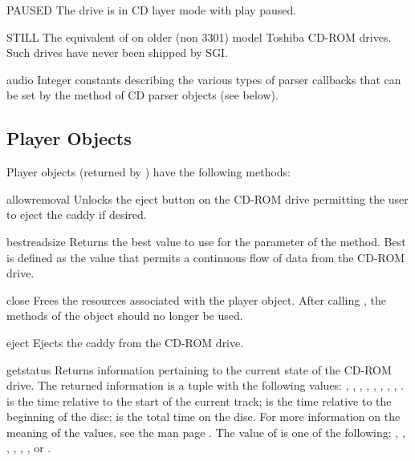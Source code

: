 \begin{datadesc}{PAUSED}
The drive is in CD layer mode with play paused.
\end{datadesc}

\begin{datadesc}{STILL}
The equivalent of  on older (non 3301) model Toshiba
CD-ROM drives.  Such drives have never been shipped by SGI.
\end{datadesc}

\begin{datadesc}{audio}
Integer constants describing the various types of parser callbacks
that can be set by the  method of CD parser
objects (see below).
\end{datadesc}


\subsection{Player Objects}
\label{player-objects}

Player objects (returned by ) have the following
methods:

\begin{methoddesc}[CD player]{allowremoval}{}
Unlocks the eject button on the CD-ROM drive permitting the user to
eject the caddy if desired.
\end{methoddesc}

\begin{methoddesc}[CD player]{bestreadsize}{}
Returns the best value to use for the  parameter of
the  method.  Best is defined as the value that
permits a continuous flow of data from the CD-ROM drive.
\end{methoddesc}

\begin{methoddesc}[CD player]{close}{}
Frees the resources associated with the player object.  After calling
, the methods of the object should no longer be used.
\end{methoddesc}

\begin{methoddesc}[CD player]{eject}{}
Ejects the caddy from the CD-ROM drive.
\end{methoddesc}

\begin{methoddesc}[CD player]{getstatus}{}
Returns information pertaining to the current state of the CD-ROM
drive.  The returned information is a tuple with the following values:
, , , , ,
, , , .
 is the time relative to the start of the current track;
 is the time relative to the beginning of the disc;
 is the total time on the disc.  For more information on
the meaning of the values, see the man page .
The value of  is one of the following: ,
, , ,
, , or .
\end{methoddesc}

